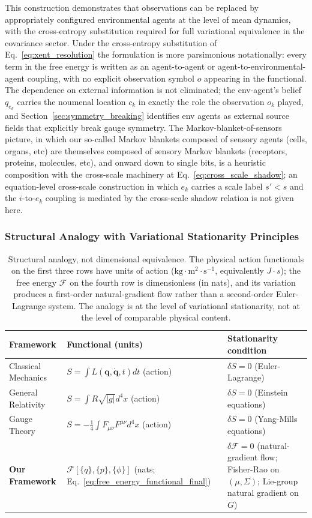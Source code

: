 \documentclass[11pt]{article}
\begin{document}
This construction demonstrates that observations can be replaced by appropriately configured environmental agents at the level of mean dynamics, with the cross-entropy substitution required for full variational equivalence in the covariance sector. Under the cross-entropy substitution of Eq.~\eqref{eq:xent_resolution} the formulation is more parsimonious notationally: every term in the free energy is written as an agent-to-agent or agent-to-environmental-agent coupling, with no explicit observation symbol $o$ appearing in the functional. The dependence on external information is not eliminated; the env-agent's belief $q_{e_k}$ carries the noumenal location $c_k$ in exactly the role the observation $o_k$ played, and Section~\ref{sec:symmetry_breaking} identifies env agents as external source fields that explicitly break gauge symmetry. The Markov-blanket-of-sensors picture, in which our so-called Markov blankets composed of sensory agents (cells, organs, etc) are themselves composed of sensory Markov blankets (receptors, proteins, molecules, etc), and onward down to single bits, is a heuristic composition with the cross-scale machinery at Eq.~\eqref{eq:cross_scale_shadow}; an equation-level cross-scale construction in which $e_k$ carries a scale label $s' < s$ and the $i$-to-$e_k$ coupling is mediated by the cross-scale shadow relation is not given here.

\subsubsection{Structural Analogy with Variational Stationarity Principles}

\begin{table}[h]
\centering
\begin{tabularx}{\textwidth}{|l|X|X|}
\hline
\textbf{Framework} & \textbf{Functional (units)} & \textbf{Stationarity condition} \\
\hline
Classical Mechanics & $S = \int L(\mathbf{q}, \dot{\mathbf{q}}, t)  dt$ (action) & $\delta S = 0$ (Euler-Lagrange) \\
General Relativity & $S = \int R \sqrt{|g|}  d^4x$ (action) & $\delta S = 0$ (Einstein equations) \\
Gauge Theory & $S = -\frac{1}{4}\int F_{\mu\nu}F^{\mu\nu}  d^4x$ (action) & $\delta S = 0$ (Yang-Mills equations) \\
\textbf{Our Framework} & $\mathcal{F}[\{q\}, \{p\}, \{\phi\}]$ (nats; Eq.~\ref{eq:free_energy_functional_final}) & $\delta \mathcal{F} = 0$ (natural-gradient flow; Fisher-Rao on $(\mu,\Sigma)$; Lie-group natural gradient on $G$) \\
\hline
\end{tabularx}
\caption{Structural analogy, not dimensional equivalence. The physical action functionals on the first three rows have units of action ($\mathrm{kg}\cdot\mathrm{m}^2\cdot\mathrm{s}^{-1}$, equivalently $J\cdot s$); the free energy $\mathcal{F}$ on the fourth row is dimensionless (in nats), and its variation produces a first-order natural-gradient flow rather than a second-order Euler-Lagrange system. The analogy is at the level of variational stationarity, not at the level of comparable physical content.}
\end{table}
\end{document}
